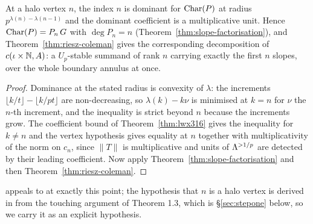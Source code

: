 \begin{theorem}
  \label{thm:halo-riesz}
  \leanok
  At a halo vertex $n$, the index $n$ is dominant for $\operatorname{Char}(P)$ at radius
  $p^{\lambda(n)-\lambda(n-1)}$ and the dominant coefficient is a multiplicative unit.  Hence
  $\operatorname{Char}(P) = P_n\,G$ with $\deg P_n = n$ (Theorem~\ref{thm:slope-factorisation}), and
  Theorem~\ref{thm:riesz-coleman} gives the corresponding decomposition of
  $c(\iota\times\mathbb{N}, A)$: a $U_p$-stable summand of rank $n$ carrying exactly the first $n$
  slopes, over the whole boundary annulus at once.
\end{theorem}

\begin{proof}
  \leanok
  Dominance at the stated radius is convexity of $\lambda$: the increments
  $\lfloor k/t\rfloor - \lfloor k/pt\rfloor$ are non-decreasing, so $\lambda(k) - k\nu$ is
  minimised at $k = n$ for $\nu$ the $n$-th increment, and the inequality is strict beyond $n$
  because the increments grow.  The coefficient bound of Theorem~\ref{thm:lwx316} gives the
  inequality for $k \neq n$ and the vertex hypothesis gives equality at $n$ together with
  multiplicativity of the norm on $c_n$, since $\lVert T\rVert$ is multiplicative and units of
  $\Lambda^{>1/p}$ are detected by their leading coefficient.  Now apply
  Theorem~\ref{thm:slope-factorisation} and then Theorem~\ref{thm:riesz-coleman}.
\end{proof}

\cite[Remark 3.25]{LWX} appeals to \cite[Proposition 3.2.2]{Kedlaya} at exactly this point; the
hypothesis that $n$ is a halo vertex is derived in \cite{LWX} from the touching argument of
Theorem 1.3, which is \S\ref{sec:stepone} below, so we carry it as an explicit hypothesis.
